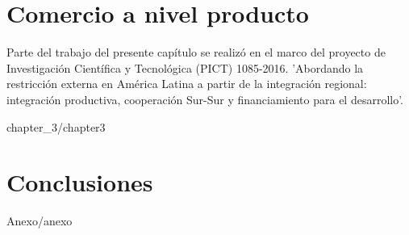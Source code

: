 \documentclass[11pt,a4paper]{tesis}
\begin{document}

\chapter[Comercio a nivel producto]{Comercio a nivel producto} \label{sec:desagregado}
Parte del trabajo del presente capítulo se realizó en el marco  del proyecto de Investigación Científica y Tecnológica (PICT) 1085-2016. 'Abordando la restricción externa en América Latina a partir de la integración regional: integración productiva, cooperación Sur-Sur y financiamiento para el desarrollo'.

{chapter_3/chapter3}



\chapter{Conclusiones}\label{sec:conclusiones}

\appendix \label{append}

{Anexo/anexo}



\backmatter
%


%
\end{document}
